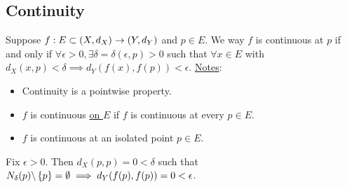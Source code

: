 \documentclass[]{article}
\begin{document}
\subsection*{Continuity}
\begin{definition}
	Suppose $f:E\subset (X,d_X) \rightarrow (Y,d_Y)$ and $p\in E$.
	We way $f$ is continuous at $p$ if and only if $\forall\epsilon>0,\exists\delta = \delta(\epsilon,p) > 0$ such that $\forall x\in E$ with $d_X(x,p)<\delta \implies d_Y(f(x),f(p))<\epsilon$.
	\ul{Notes}:	
\end{definition}
\begin{itemize}
	\item Continuity is a pointwise property.
	\item $f$ is continuous \ul{on $E$} if $f$ is continuous at every $p\in E$.
	\item $f$ is continuous at an isolated point $p\in E$.
\end{itemize}
\begin{example}
	Fix $\epsilon>0$. Then $d_X(p,p)=0<\delta$ such that $N_\delta(p)\backslash\left\{ p \right\}=\emptyset \implies d_Y(f(p),f(p))= 0<\epsilon$.
\end{example}
\end{document}
